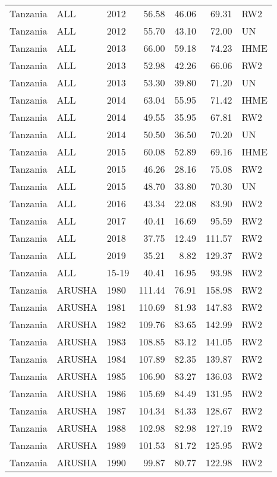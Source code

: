 \begin{longtable}{lllrrrl}
  Tanzania & ALL & 2012 & 56.58 & 46.06 & 69.31 & RW2 \\ 
  Tanzania & ALL & 2012 & 55.70 & 43.10 & 72.00 & UN \\ 
  Tanzania & ALL & 2013 & 66.00 & 59.18 & 74.23 & IHME \\ 
  Tanzania & ALL & 2013 & 52.98 & 42.26 & 66.06 & RW2 \\ 
  Tanzania & ALL & 2013 & 53.30 & 39.80 & 71.20 & UN \\ 
  Tanzania & ALL & 2014 & 63.04 & 55.95 & 71.42 & IHME \\ 
  Tanzania & ALL & 2014 & 49.55 & 35.95 & 67.81 & RW2 \\ 
  Tanzania & ALL & 2014 & 50.50 & 36.50 & 70.20 & UN \\ 
  Tanzania & ALL & 2015 & 60.08 & 52.89 & 69.16 & IHME \\ 
  Tanzania & ALL & 2015 & 46.26 & 28.16 & 75.08 & RW2 \\ 
  Tanzania & ALL & 2015 & 48.70 & 33.80 & 70.30 & UN \\ 
  Tanzania & ALL & 2016 & 43.34 & 22.08 & 83.90 & RW2 \\ 
  Tanzania & ALL & 2017 & 40.41 & 16.69 & 95.59 & RW2 \\ 
  Tanzania & ALL & 2018 & 37.75 & 12.49 & 111.57 & RW2 \\ 
  Tanzania & ALL & 2019 & 35.21 & 8.82 & 129.37 & RW2 \\ 
  Tanzania & ALL & 15-19 & 40.41 & 16.95 & 93.98 & RW2 \\ 
  Tanzania & ARUSHA & 1980 & 111.44 & 76.91 & 158.98 & RW2 \\ 
  Tanzania & ARUSHA & 1981 & 110.69 & 81.93 & 147.83 & RW2 \\ 
  Tanzania & ARUSHA & 1982 & 109.76 & 83.65 & 142.99 & RW2 \\ 
  Tanzania & ARUSHA & 1983 & 108.85 & 83.12 & 141.05 & RW2 \\ 
  Tanzania & ARUSHA & 1984 & 107.89 & 82.35 & 139.87 & RW2 \\ 
  Tanzania & ARUSHA & 1985 & 106.90 & 83.27 & 136.03 & RW2 \\ 
  Tanzania & ARUSHA & 1986 & 105.69 & 84.49 & 131.95 & RW2 \\ 
  Tanzania & ARUSHA & 1987 & 104.34 & 84.33 & 128.67 & RW2 \\ 
  Tanzania & ARUSHA & 1988 & 102.98 & 82.98 & 127.19 & RW2 \\ 
  Tanzania & ARUSHA & 1989 & 101.53 & 81.72 & 125.95 & RW2 \\ 
  Tanzania & ARUSHA & 1990 & 99.87 & 80.77 & 122.98 & RW2 \\ 

\end{longtable}
